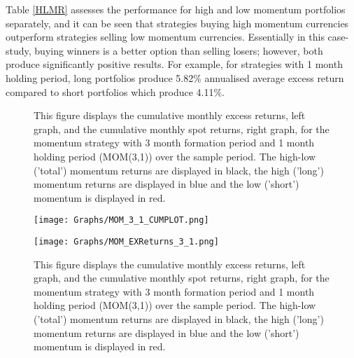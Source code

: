 \documentclass{article}
\begin{document}
Table \ref{HLMR} assesses the performance for high and low momentum portfolios separately, and it can be seen that strategies buying high momentum currencies outperform strategies selling low momentum currencies. Essentially in this case-study, buying winners is a better option than selling losers; however, both produce significantly positive results. For example, for strategies with 1 month holding period, long portfolios produce 5.82\% annualised average excess return compared to short portfolios which produce 4.11\%. \\

\begin{figure}[p]
    \centering
    \vspace{-2.5cm}
    \begin{minipage}{1\textwidth}
    \centering
    \caption{This figure displays the cumulative monthly excess returns, left graph, and the cumulative monthly spot returns, right graph, for the momentum strategy with 3 month formation period and 1 month holding period (MOM(3,1)) over the sample period. The high-low ('total') momentum returns are displayed in black, the high ('long') momentum returns are displayed in blue and the low ('short') momentum is displayed in red.}
    \begin{adjustwidth}{-0.3cm}{}
    \texttt{[image: Graphs/MOM\_3\_1\_CUMPLOT.png]}
    \end{adjustwidth}
    \label{CS31}
    \end{minipage}

    \begin{minipage}{1\textwidth}
    \centering
    \caption{This figure displays the cumulative monthly excess returns, left graph, and the cumulative monthly spot returns, right graph, for the momentum strategy with 3 month formation period and 1 month holding period (MOM(3,1)) over the sample period. The high-low ('total') momentum returns are displayed in black, the high ('long') momentum returns are displayed in blue and the low ('short') momentum is displayed in red.}
    \begin{adjustwidth}{-0.5cm}{}
    \texttt{[image: Graphs/MOM\_EXReturns\_3\_1.png]}
    \end{adjustwidth}
    \label{MR31}
    \end{minipage}
\end{figure}
\end{document}
